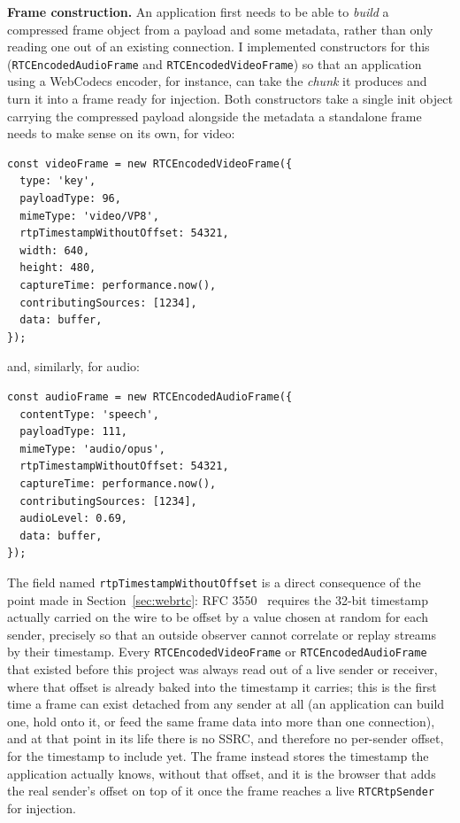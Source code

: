 \documentclass[11pt]{article}
\begin{document}
\textbf{Frame construction.} An application first needs to be able to \emph{build} a compressed frame object from a payload and some metadata, rather than only reading one out of an existing connection. I implemented constructors for this (\texttt{RTCEncodedAudioFrame} and \texttt{RTCEncodedVideoFrame}) so that an application using a WebCodecs encoder, for instance, can take the \textit{chunk} it produces and turn it into a frame ready for injection. Both constructors take a single init object carrying the compressed payload alongside the metadata a standalone frame needs to make sense on its own, for video:

\begin{lstlisting}[language=JS]
const videoFrame = new RTCEncodedVideoFrame({
  type: 'key',
  payloadType: 96,
  mimeType: 'video/VP8',
  rtpTimestampWithoutOffset: 54321,
  width: 640,
  height: 480,
  captureTime: performance.now(),
  contributingSources: [1234],
  data: buffer,
});
\end{lstlisting}

and, similarly, for audio:

\begin{lstlisting}[language=JS]
const audioFrame = new RTCEncodedAudioFrame({
  contentType: 'speech',
  payloadType: 111,
  mimeType: 'audio/opus',
  rtpTimestampWithoutOffset: 54321,
  captureTime: performance.now(),
  contributingSources: [1234],
  audioLevel: 0.69,
  data: buffer,
});
\end{lstlisting}

The field named \texttt{rtpTimestampWithoutOffset} is a direct consequence of the point made in Section~\ref{sec:webrtc}: RFC 3550~\cite{rfc3550} requires the 32-bit timestamp actually carried on the wire to be offset by a value chosen at random for each sender, precisely so that an outside observer cannot correlate or replay streams by their timestamp. Every \texttt{RTCEncodedVideoFrame} or \texttt{RTCEncodedAudioFrame} that existed before this project was always read out of a live sender or receiver, where that offset is already baked into the timestamp it carries; this is the first time a frame can exist detached from any sender at all (an application can build one, hold onto it, or feed the same frame data into more than one connection), and at that point in its life there is no SSRC, and therefore no per-sender offset, for the timestamp to include yet. The frame instead stores the timestamp the application actually knows, without that offset, and it is the browser that adds the real sender's offset on top of it once the frame reaches a live \texttt{RTCRtpSender} for injection.
\end{document}
